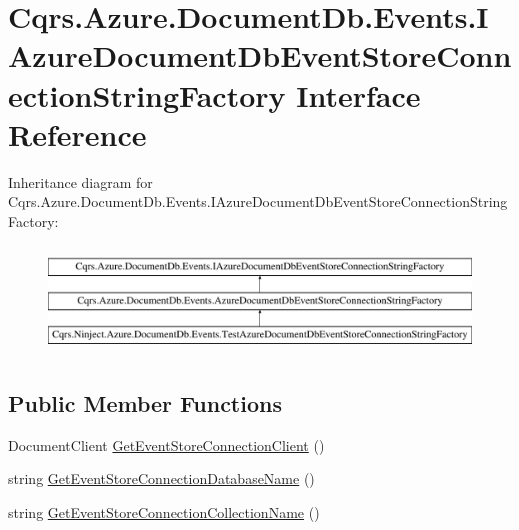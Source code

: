 \hypertarget{interfaceCqrs_1_1Azure_1_1DocumentDb_1_1Events_1_1IAzureDocumentDbEventStoreConnectionStringFactory}{}\section{Cqrs.\+Azure.\+Document\+Db.\+Events.\+I\+Azure\+Document\+Db\+Event\+Store\+Connection\+String\+Factory Interface Reference}
\label{interfaceCqrs_1_1Azure_1_1DocumentDb_1_1Events_1_1IAzureDocumentDbEventStoreConnectionStringFactory}
Inheritance diagram for Cqrs.\+Azure.\+Document\+Db.\+Events.\+I\+Azure\+Document\+Db\+Event\+Store\+Connection\+String\+Factory\+:\begin{figure}[H]
\begin{center}
\leavevmode
\includegraphics[height=2.891566cm]{interfaceCqrs_1_1Azure_1_1DocumentDb_1_1Events_1_1IAzureDocumentDbEventStoreConnectionStringFactory}
\end{center}
\end{figure}
\subsection*{Public Member Functions}
\begin{DoxyCompactItemize}
\item 
Document\+Client \hyperlink{interfaceCqrs_1_1Azure_1_1DocumentDb_1_1Events_1_1IAzureDocumentDbEventStoreConnectionStringFactory_a2b5e3449d906b74736fee450975ad358_a2b5e3449d906b74736fee450975ad358}{Get\+Event\+Store\+Connection\+Client} ()
\item 
string \hyperlink{interfaceCqrs_1_1Azure_1_1DocumentDb_1_1Events_1_1IAzureDocumentDbEventStoreConnectionStringFactory_a826c95e8dab31be9ef97cf3bea92d95d_a826c95e8dab31be9ef97cf3bea92d95d}{Get\+Event\+Store\+Connection\+Database\+Name} ()
\item 
string \hyperlink{interfaceCqrs_1_1Azure_1_1DocumentDb_1_1Events_1_1IAzureDocumentDbEventStoreConnectionStringFactory_a4268ad0884bad88528a5eb10292d9d3b_a4268ad0884bad88528a5eb10292d9d3b}{Get\+Event\+Store\+Connection\+Collection\+Name} ()
\end{DoxyCompactItemize}


